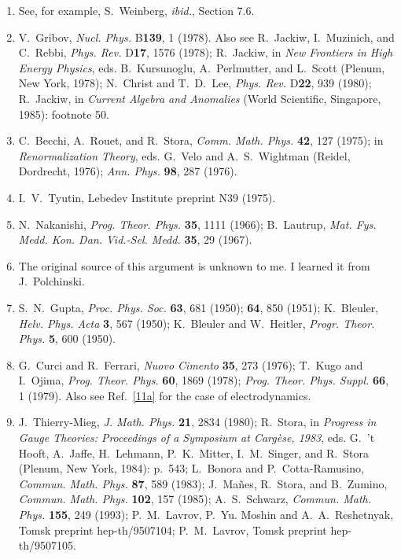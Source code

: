 \begin{enumerate}
  \item {}\label{ch15-ref-8}
  See, for example, S.~Weinberg, \textit{ibid.}, Section 7.6.

  \item {}\label{ch15-ref-9}
  V.~Gribov, \textit{Nucl. Phys.} B\textbf{139}, 1 (1978). Also see R.~Jackiw, I.~Muzinich, and C.~Rebbi, \textit{Phys. Rev.} D\textbf{17}, 1576 (1978); R.~Jackiw, in \textit{New Frontiers in High Energy Physics}, eds. B.~Kursunoglu, A.~Perlmutter, and L.~Scott (Plenum, New York, 1978); N.~Christ and T.~D.~Lee, \textit{Phys. Rev.} D\textbf{22}, 939 (1980); R.~Jackiw, in \textit{Current Algebra and Anomalies} (World Scientific, Singapore, 1985): footnote 50.

  \item {}\label{ch15-ref-10}
  C.~Becchi, A.~Rouet, and R.~Stora, \textit{Comm. Math. Phys.} \textbf{42}, 127 (1975); in \textit{Renormalization Theory}, eds. G.~Velo and A.~S.~Wightman (Reidel, Dordrecht, 1976); \textit{Ann. Phys.} \textbf{98}, 287 (1976).

  \item {}\label{ch15-ref-11}
  I.~V.~Tyutin, Lebedev Institute preprint N39 (1975).

  \item[11a.] \label{ch15-ref-11a}
  N.~Nakanishi, \textit{Prog. Theor. Phys.} \textbf{35}, 1111 (1966); B.~Lautrup, \textit{Mat. Fys. Medd. Kon. Dan. Vid.-Sel. Medd.} \textbf{35}, 29 (1967).

  \item {}\label{ch15-ref-12}
  The original source of this argument is unknown to me. I learned it from J.~Polchinski.

  \item {}\label{ch15-ref-13}
  S.~N.~Gupta, \textit{Proc. Phys. Soc.} \textbf{63}, 681 (1950); \textbf{64}, 850 (1951); K.~Bleuler, \textit{Helv. Phys. Acta} \textbf{3}, 567 (1950); K.~Bleuler and W.~Heitler, \textit{Progr. Theor. Phys.} \textbf{5}, 600 (1950).

  \item[13a.] \label{ch15-ref-13a}
  G.~Curci and R.~Ferrari, \textit{Nuovo Cimento} \textbf{35}, 273 (1976); T.~Kugo and I.~Ojima, \textit{Prog. Theor. Phys.} \textbf{60}, 1869 (1978); \textit{Prog. Theor. Phys. Suppl.} \textbf{66}, 1 (1979). Also see Ref.~\hyperref[ch15-ref-11a]{[11a]} for the case of electrodynamics.

  \item {}\label{ch15-ref-14}
  J.~Thierry-Mieg, \textit{J. Math. Phys.} \textbf{21}, 2834 (1980); R.~Stora, in \textit{Progress in Gauge Theories: Proceedings of a Symposium at Carg\`ese, 1983}, eds. G.~'t Hooft, A.~Jaffe, H.~Lehmann, P.~K.~Mitter, I.~M.~Singer, and R.~Stora (Plenum, New York, 1984): p.~543; L.~Bonora and P.~Cotta-Ramusino, \textit{Commun. Math. Phys.} \textbf{87}, 589 (1983); J.~Ma\~nes, R.~Stora, and B.~Zumino, \textit{Commun. Math. Phys.} \textbf{102}, 157 (1985); A.~S.~Schwarz, \textit{Commun. Math. Phys.} \textbf{155}, 249 (1993); P.~M.~Lavrov, P.~Yu. Moshin and A.~A.~Reshetnyak, Tomsk preprint hep-th/9507104; P.~M.~Lavrov, Tomsk preprint hep-th/9507105.


\end{enumerate}
